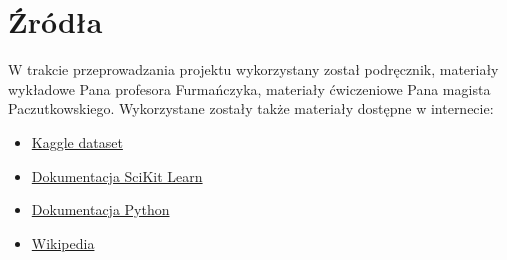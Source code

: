 \documentclass{article}
\begin{document}
\section{Źródła}
 W trakcie przeprowadzania projektu wykorzystany został podręcznik, materiały wykładowe Pana profesora Furmańczyka, materiały ćwiczeniowe Pana magista Paczutkowskiego. Wykorzystane zostały także materiały dostępne w internecie:
 \begin{itemize}
     \item \href{https://www.kaggle.com/datasets/fedesoriano/stellar-classification-dataset-sdss17}{Kaggle dataset}
     \item \href{https://scikit-learn.org/stable/user_guide.html}{Dokumentacja SciKit Learn}
     \item \href{https://docs.python.org/3/}{Dokumentacja Python}
     \item \href{https://en.wikipedia.org/wiki/Main_Page}{Wikipedia}
 \end{itemize}

 
\end{document}

